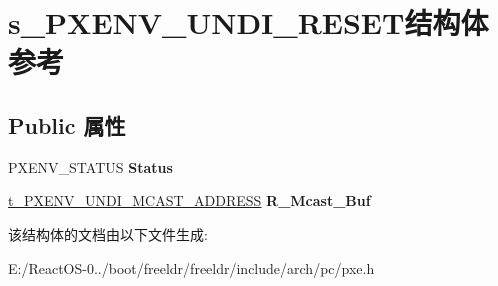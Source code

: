 \hypertarget{structs___p_x_e_n_v___u_n_d_i___r_e_s_e_t}{}\section{s\+\_\+\+P\+X\+E\+N\+V\+\_\+\+U\+N\+D\+I\+\_\+\+R\+E\+S\+E\+T结构体 参考}
\label{structs___p_x_e_n_v___u_n_d_i___r_e_s_e_t}
\subsection*{Public 属性}
\begin{DoxyCompactItemize}
\item 
\mbox{\label{structs___p_x_e_n_v___u_n_d_i___r_e_s_e_t_a2c3925b1a88c3a4c0c64055ae9f68149}} 
P\+X\+E\+N\+V\+\_\+\+S\+T\+A\+T\+US {\bfseries Status}
\item 
\mbox{\label{structs___p_x_e_n_v___u_n_d_i___r_e_s_e_t_a410b34bd94ce0d77dca68563a66a99dc}} 
\hyperlink{structs___p_x_e_n_v___u_n_d_i___m_c_a_s_t___a_d_d_r_e_s_s}{t\+\_\+\+P\+X\+E\+N\+V\+\_\+\+U\+N\+D\+I\+\_\+\+M\+C\+A\+S\+T\+\_\+\+A\+D\+D\+R\+E\+SS} {\bfseries R\+\_\+\+Mcast\+\_\+\+Buf}
\end{DoxyCompactItemize}


该结构体的文档由以下文件生成\+:\begin{DoxyCompactItemize}
\item 
E\+:/\+React\+O\+S-\/0../boot/freeldr/freeldr/include/arch/pc/pxe.\+h\end{DoxyCompactItemize}
